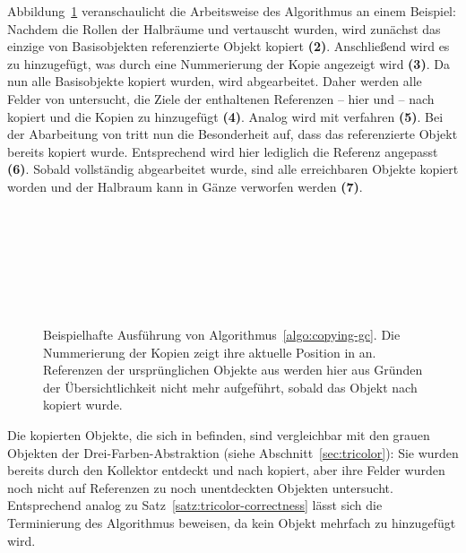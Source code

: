 Abbildung~\ref{fig:fenichel-example} veranschaulicht die Arbeitsweise des Algorithmus an einem Beispiel:
Nachdem die Rollen der Halbräume  und  vertauscht wurden, wird zunächst das einzige von Basisobjekten referenzierte Objekt  kopiert \textbf{(2)}.
Anschließend wird es zu  hinzugefügt, was durch eine Nummerierung der Kopie  angezeigt wird \textbf{(3)}.
Da nun alle Basisobjekte kopiert wurden, wird  abgearbeitet.
Daher werden alle Felder von  untersucht, die Ziele der enthaltenen Referenzen -- hier  und  -- nach  kopiert und die Kopien zu  hinzugefügt \textbf{(4)}.
Analog wird mit  verfahren \textbf{(5)}.
Bei der Abarbeitung von  tritt nun die Besonderheit auf, dass das referenzierte Objekt  bereits kopiert wurde.
Entsprechend wird hier lediglich die Referenz angepasst \textbf{(6)}.
Sobald  vollständig abgearbeitet wurde, sind alle erreichbaren Objekte kopiert worden und der Halbraum  kann in Gänze verworfen werden \textbf{(7)}.

\newpage

\begin{figure}[h!]
	\centering
	\\[0.5cm]
	\\[0.5cm]
	\\[0.5cm]
	\\[0.5cm]
	\\[0.5cm]
	\\[0.5cm]
	
	\caption[Ausführung der kopierenden Garbage Collection]{Beispielhafte Ausführung von Algorithmus~\ref{algo:copying-gc}. Die Nummerierung der Kopien zeigt ihre aktuelle Position in  an. Referenzen der ursprünglichen Objekte aus  werden hier aus Gründen der Übersichtlichkeit nicht mehr aufgeführt, sobald das Objekt nach  kopiert wurde.}
	\label{fig:fenichel-example}
\end{figure}

Die kopierten Objekte, die sich in  befinden, sind vergleichbar mit den grauen Objekten der Drei-Farben-Abstraktion (siehe Abschnitt~\ref{sec:tricolor}):
Sie wurden bereits durch den Kollektor entdeckt und nach  kopiert, aber ihre Felder wurden noch nicht auf Referenzen zu noch unentdeckten Objekten untersucht.
Entsprechend analog zu Satz~\ref{satz:tricolor-correctness} lässt sich die Terminierung des Algorithmus beweisen, da kein Objekt mehrfach zu  hinzugefügt wird.

